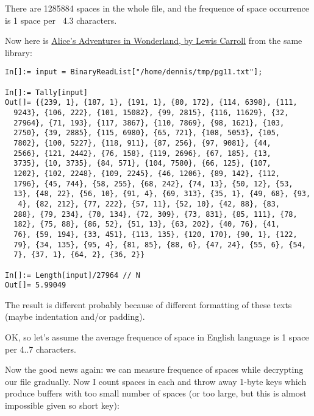 There are 1285884 spaces in the whole file, and the frequence of space occurrence is 1 space per ~4.3 characters.

Now here is \href{http://www.gutenberg.org/ebooks/11}{Alice's Adventures in Wonderland, by Lewis Carroll} from the same library:

\begin{lstlisting}[caption=Mathematica]
In[]:= input = BinaryReadList["/home/dennis/tmp/pg11.txt"];

In[]:= Tally[input]
Out[]= {{239, 1}, {187, 1}, {191, 1}, {80, 172}, {114, 6398}, {111, 
  9243}, {106, 222}, {101, 15082}, {99, 2815}, {116, 11629}, {32, 
  27964}, {71, 193}, {117, 3867}, {110, 7869}, {98, 1621}, {103, 
  2750}, {39, 2885}, {115, 6980}, {65, 721}, {108, 5053}, {105, 
  7802}, {100, 5227}, {118, 911}, {87, 256}, {97, 9081}, {44, 
  2566}, {121, 2442}, {76, 158}, {119, 2696}, {67, 185}, {13, 
  3735}, {10, 3735}, {84, 571}, {104, 7580}, {66, 125}, {107, 
  1202}, {102, 2248}, {109, 2245}, {46, 1206}, {89, 142}, {112, 
  1796}, {45, 744}, {58, 255}, {68, 242}, {74, 13}, {50, 12}, {53, 
  13}, {48, 22}, {56, 10}, {91, 4}, {69, 313}, {35, 1}, {49, 68}, {93,
   4}, {82, 212}, {77, 222}, {57, 11}, {52, 10}, {42, 88}, {83, 
  288}, {79, 234}, {70, 134}, {72, 309}, {73, 831}, {85, 111}, {78, 
  182}, {75, 88}, {86, 52}, {51, 13}, {63, 202}, {40, 76}, {41, 
  76}, {59, 194}, {33, 451}, {113, 135}, {120, 170}, {90, 1}, {122, 
  79}, {34, 135}, {95, 4}, {81, 85}, {88, 6}, {47, 24}, {55, 6}, {54, 
  7}, {37, 1}, {64, 2}, {36, 2}}

In[]:= Length[input]/27964 // N
Out[]= 5.99049
\end{lstlisting}

The result is different probably because of different formatting of these texts (maybe indentation and/or padding).

OK, so let's assume the average frequence of space in English language is 1 space per 4..7 characters.

Now the good news again: we can measure frequence of spaces while decrypting our file gradually.
Now I count spaces in each  and throw away 1-byte keys which produce buffers with too small number of spaces (or too large, but this is almost impossible given so short key):

